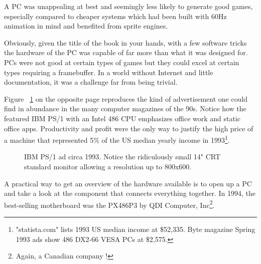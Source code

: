 \par
 A PC was unappealing at best and seemingly less likely to generate good games, especially compared to cheaper systems which had been built with 60Hz animation in mind and benefited from sprite engines.\\
 \par
  Obviously, given the title of the book in your hands, with a few software tricks the hardware of the PC was capable of far more than what it was designed for. PCs were not good at certain types of games but they could excel at certain types requiring a framebuffer. In a world without Internet and little documentation, it was a challenge far from being trivial.\\
\par

Figure ~\ref{ibm_ps1_top} on the opposite page reproduces the kind of advertisement one could find in abundance in the many computer magazines of the 90s. Notice how the featured IBM PS/1 with an Intel 486 CPU emphasizes office work and static office apps. Productivity and profit were the only way to justify the high price of a machine that represented 5\% of the US median yearly income in 1993\footnote{ "statista.com" lists 1993 US median income at \$52,335. Byte magazine Spring 1993 ads show 486 DX2-66 VESA PCs at \$2,575.}.\\
\par

\par
\begin{figure}[H] \centering
{}
\caption{IBM PS/1 ad circa 1993. Notice the ridiculously small 14" CRT standard monitor allowing a resolution up to 800x600.}
\label{ibm_ps1_top}
\end{figure}


















\cleartoleftpage
 
A practical way to get an overview of the hardware available is to open up a PC and take a look at the component that connects everything together. In 1994, the best-selling motherboard was the PX486P3 by QDI Computer, Inc\footnote{Again, a Canadian company  !}.\\

